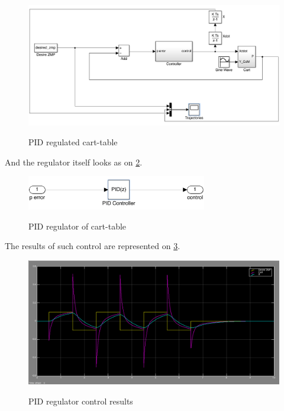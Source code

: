 \documentclass[12pt,a4paper]{report}
\begin{document}
		\begin{figure}[h!]
			\vspace{-0.2cm}
			\centering
			{\includegraphics[width=1\textwidth]{15}}
			\caption{PID regulated cart-table}
			\label{fig:15}
			\vspace{-0.1cm}
		\end{figure}
		
		And the regulator itself looks as on \cref{fig:16}.
		
		\begin{figure}[h!]
			\vspace{-0.2cm}
			\centering
			{\includegraphics[width=0.7\textwidth]{16}}
			\caption{PID regulator of cart-table}
			\label{fig:16}
			\vspace{-0.1cm}
		\end{figure}
		
		The results of such control are represented on \cref{fig:17}.
		
		\begin{figure}[h!]
			\vspace{-0.2cm}
			\centering
			{\includegraphics[width=1\textwidth]{17}}
			\caption{PID regulator control results}
			\label{fig:17}
			\vspace{-0.1cm}
		\end{figure}
		
\end{document}
